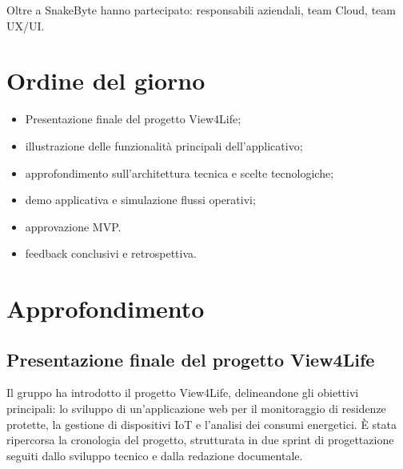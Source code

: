 \documentclass[10pt, letterpaper]{article}
\begin{document}
\makeTitlePage

\newpage

\tableofcontents

\newpage



\makeMeetingParticipantsTable

Oltre a SnakeByte hanno partecipato: responsabili aziendali, team Cloud, team UX/UI.
\section{Ordine del giorno}
\begin{itemize}
      \item Presentazione finale del progetto View4Life;
      \item illustrazione delle funzionalità principali dell'applicativo;
      \item approfondimento sull'architettura tecnica e scelte tecnologiche;
      \item demo applicativa e simulazione flussi operativi;
      \item approvazione MVP.
      \item feedback conclusivi e retrospettiva.
\end{itemize}

\section{Approfondimento}

\subsection*{Presentazione finale del progetto View4Life}
Il gruppo ha introdotto il progetto View4Life, delineandone gli obiettivi principali: lo sviluppo di un'applicazione web per il monitoraggio di residenze protette, la gestione di dispositivi IoT e l'analisi dei consumi energetici. È stata ripercorsa la cronologia del progetto, strutturata in due sprint di progettazione seguiti dallo sviluppo tecnico e dalla redazione documentale.
\end{document}
